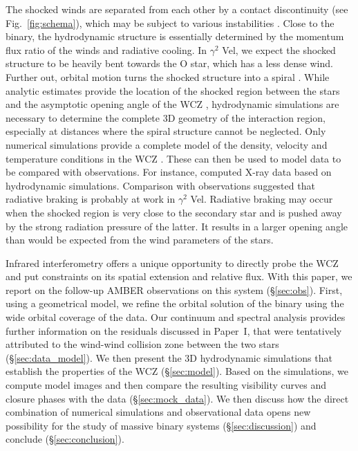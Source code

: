 \documentclass[usenatbib]{mnras}%
\begin{document}
The shocked winds are separated from each other by a contact discontinuity (see Fig.~\ref{fig:schema}), which may be subject to various instabilities \citep{Stevens:1992on}. Close to the binary, the hydrodynamic structure is essentially determined by the momentum flux ratio of the winds and radiative cooling.  In $\gamma^2$ Vel, we expect the shocked structure to be heavily bent towards the O star, which has a less dense wind. Further out, orbital motion turns the shocked structure into a spiral \citep{2012A&A...546A..60L}.  While analytic estimates provide the location of the shocked region between the stars and the asymptotic opening angle of the WCZ \citep{1990FlDy...25..629L}, hydrodynamic simulations are necessary to determine the complete 3D geometry of the interaction region, especially at distances where the spiral structure cannot be neglected. Only numerical simulations provide a complete model of the density, velocity and temperature conditions in the WCZ \citep{2009MNRAS.396.1743P}. These can then be used to model data  to be compared with observations. For instance, \citet{1999IAUS..193..298W,2005MNRAS.356.1308H} computed  X-ray data based on hydrodynamic simulations. Comparison with observations suggested that radiative braking is probably at work in $\gamma^2$ Vel. Radiative braking  \citep{1997ApJ...475..786G} may occur when the shocked region is very close to the secondary star and is pushed away by the strong radiation pressure of the latter. It results in a larger opening angle than would be expected from the wind parameters of the stars. 

Infrared interferometry offers a unique opportunity to  directly probe the WCZ and put constraints on its spatial extension and relative flux. With this paper, we report on the follow-up AMBER observations on this system (\S\ref{sec:obs}). First, using a geometrical model, we refine the orbital solution of the binary using the wide orbital coverage of the data. Our continuum and spectral analysis provides further information on the residuals discussed in Paper~I, that were tentatively attributed to the wind-wind collision zone between the two stars (\S\ref{sec:data_model}).  We then present the 3D hydrodynamic simulations that establish the properties of the WCZ (\S\ref{sec:model}). Based on the simulations, we compute model images and then compare the resulting visibility curves and closure phases with the data (\S\ref{sec:mock_data}). We then discuss how the direct combination of numerical simulations and observational data opens new possibility for the study of massive binary systems (\S\ref{sec:discussion}) and conclude (\S\ref{sec:conclusion}).
 
\end{document}
